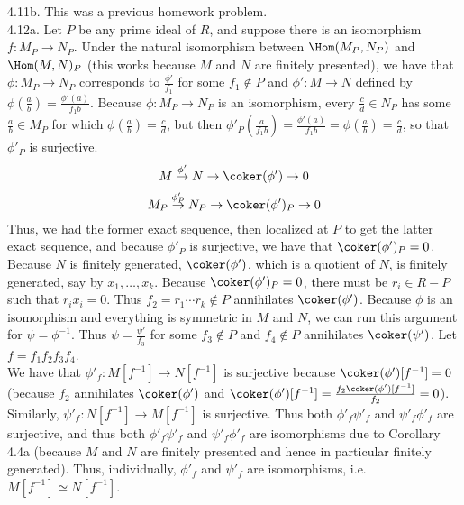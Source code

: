 \documentclass[11pt]{article}
\begin{document}
\num{4.11b.} This was a previous homework problem.    \\

\num{4.12a.} Let $P$ be any prime ideal of $R$, and suppose there is an isomorphism $f:M_P\rightarrow N_P$. Under the natural isomorphism between $\Hom(M_P,N_P)$ and $\Hom(M,N)_P$ (this works because $M$ and $N$ are finitely presented), we have that $\phi:M_P\rightarrow N_P$ corresponds to $\frac{\phi'}{f_1}$ for some $f_1\notin P$ and  $\phi':M\rightarrow N$ defined by $\phi(\frac{a}{b})=\frac{\phi'(a)}{f_1b}$. Because $\phi:M_P\rightarrow N_P$ is an isomorphism, every $\frac{c}{d}\in N_P$ has some $\frac{a}{b}\in M_P$ for which $\phi(\frac{a}{b})=\frac{c}{d}$, but then $\phi'_P(\frac{a}{f_1b})=\frac{\phi'(a)}{f_1b}=\phi(\frac{a}{b})=\frac{c}{d}$, so that $\phi'_P$ is surjective. 
\[M\stackrel{\phi'}{\rightarrow}N\rightarrow\coker(\phi')\rightarrow0\]
\[M_P\stackrel{\phi'_P}{\rightarrow}N_P\rightarrow\coker(\phi')_P\rightarrow0\]
Thus, we had the former exact sequence, then localized at $P$ to get the latter exact sequence, and because $\phi'_P$ is surjective, we have that $\coker(\phi')_P=0$. Because $N$ is finitely generated, $\coker(\phi')$, which is a quotient of $N$, is finitely generated, say by $x_1,\ldots,x_k$. Because $\coker(\phi')_P=0$, there must be $r_i\in R-P$ such that $r_ix_i=0$. Thus $f_2=r_1\cdots r_k\notin P$ annihilates $\coker(\phi')$. Because $\phi$ is an isomorphism and everything is symmetric in $M$ and $N$, we can run this argument for $\psi=\phi^{-1}$. Thus $\psi=\frac{\psi'}{f_3}$ for some $f_3\notin P$ and $f_4\notin P$ annihilates $\coker(\psi')$. Let $f=f_1f_2f_3f_4$.     \\

We have that $\phi'_f:M[f^{-1}]\rightarrow N[f^{-1}]$ is surjective because $\coker(\phi')[f^{-1}]=0$ (because $f_2$ annihilates $\coker(\phi')$ and $\coker(\phi')[f^{-1}]=\frac{f_2\coker(\phi')[f^{-1}]}{f_2}=0$). Similarly, $\psi'_f:N[f^{-1}]\rightarrow M[f^{-1}]$ is surjective. Thus both $\phi'_f\psi'_f$ and $\psi'_f\phi'_f$ are surjective, and thus both $\phi'_f\psi'_f$ and $\psi'_f\phi'_f$ are isomorphisms due to Corollary 4.4a (because $M$ and $N$ are finitely presented and hence in particular finitely generated). Thus, individually, $\phi'_f$ and $\psi'_f$ are isomorphisms, i.e. $M[f^{-1}]\simeq N[f^{-1}]$.  \\
\end{document}
